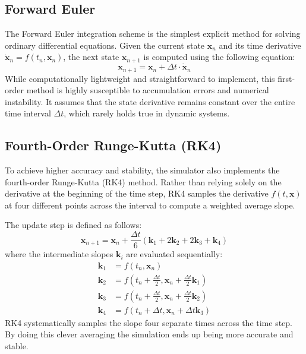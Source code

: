 \documentclass{article}
\begin{document}
\subsection{Forward Euler}
The Forward Euler integration scheme is the simplest explicit method for solving ordinary differential equations. Given the current state $\mathbf{x}_n$ and its time derivative $\mathbf{\dot{x}}_n = f(t_n, \mathbf{x}_n)$, the next state $\mathbf{x}_{n+1}$ is computed using the following equation:
\begin{equation}
	\mathbf{x}_{n+1} = \mathbf{x}_n + \Delta t \cdot \mathbf{\dot{x}}_n
\end{equation}
While computationally lightweight and straightforward to implement, this first-order method is highly susceptible to accumulation errors and numerical instability. It assumes that the state derivative remains constant over the entire time interval $\Delta t$, which rarely holds true in dynamic systems.

\subsection{Fourth-Order Runge-Kutta (RK4)}
To achieve higher accuracy and stability, the simulator also implements the fourth-order Runge-Kutta (RK4) method. Rather than relying solely on the derivative at the beginning of the time step, RK4 samples the derivative $f(t, \mathbf{x})$ at four different points across the interval to compute a weighted average slope. 

The update step is defined as follows:
\begin{equation}
	\mathbf{x}_{n+1} = \mathbf{x}_n + \frac{\Delta t}{6} (\mathbf{k}_1 + 2\mathbf{k}_2 + 2\mathbf{k}_3 + \mathbf{k}_4)
\end{equation}
where the intermediate slopes $\mathbf{k}_i$ are evaluated sequentially:
\begin{align}
	\mathbf{k}_1 &= f(t_n, \mathbf{x}_n) \\
	\mathbf{k}_2 &= f\left(t_n + \frac{\Delta t}{2}, \mathbf{x}_n + \frac{\Delta t}{2}\mathbf{k}_1\right) \\
	\mathbf{k}_3 &= f\left(t_n + \frac{\Delta t}{2}, \mathbf{x}_n + \frac{\Delta t}{2}\mathbf{k}_2\right) \\
	\mathbf{k}_4 &= f(t_n + \Delta t, \mathbf{x}_n + \Delta t \mathbf{k}_3)
\end{align}
RK4 systematically samples the slope four separate times across the time step. By doing this clever averaging the simulation ends up being more accurate and stable.
\end{document}
